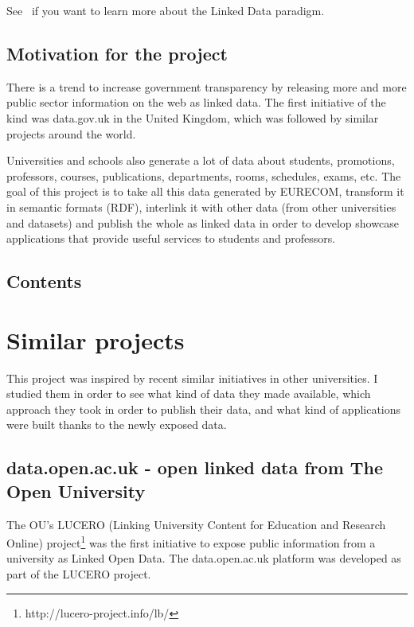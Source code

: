 \documentclass[a4paper,11pt]{report}
\begin{document}
See~\cite{Heath2011} if you want to learn more about the Linked Data paradigm. 

\section*{Motivation for the project}
There is a trend to increase government transparency by releasing more and more public sector information on the web as linked data. The first initiative of the kind was data.gov.uk in the United Kingdom, which was followed by similar projects around the world. 

Universities and schools also generate a lot of data about students, promotions, professors, courses, publications, departments, rooms, schedules, exams, etc. The goal of this project is to take all this data generated by EURECOM, transform it in semantic formats (RDF), interlink it with other data (from other universities and datasets) and publish the whole as linked data in order to develop showcase applications that provide useful services to students and professors. %

\section*{Contents}

\chapter{Similar projects}

This project was inspired by recent similar initiatives in other universities. I studied them in order to see what kind of data they made available, which approach they took in order to publish their data, and what kind of applications were built thanks to the newly exposed data. 
\section*{data.open.ac.uk - open linked data from The Open University}
The OU's LUCERO (Linking University Content for Education and Research Online) project\footnote{http://lucero-project.info/lb/} was the first initiative to expose public information from a university as Linked Open Data. The data.open.ac.uk platform was developed as part of the LUCERO project. 
\end{document}
